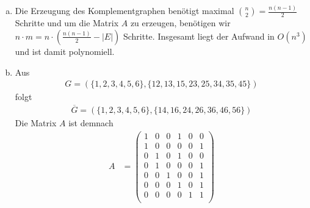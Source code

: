 \begin{enumerate}
\begin{enumerate}[(a)]
      \item Die Erzeugung des Komplementgraphen benötigt maximal $\binom{n}{2} =
        \frac{n(n-1)}{2}$ Schritte und um die Matrix $A$ zu erzeugen, benötigen
        wir $n \cdot m = n \cdot \left(\frac{n(n-1)}{2} - |E|\right)$ Schritte.
        Insgesamt liegt der Aufwand in $O(n^3)$ und ist damit polynomiell.

      \item Aus
        \begin{align*}
          G = (\{1,2,3,4,5,6\}, \{12, 13, 15, 23, 25, 34, 35, 45\})
        \end{align*}
        folgt
        \begin{align*}
          \overline{G} = (\{1,2,3,4,5,6\}, \{14, 16, 24, 26, 36, 46, 56\})
        \end{align*}
        Die Matrix $A$ ist demnach
        \begin{align*}
          A & = \begin{pmatrix}
            1 & 0 & 0 & 1 & 0 & 0\\
            1 & 0 & 0 & 0 & 0 & 1\\
            0 & 1 & 0 & 1 & 0 & 0\\
            0 & 1 & 0 & 0 & 0 & 1\\
            0 & 0 & 1 & 0 & 0 & 1\\
            0 & 0 & 0 & 1 & 0 & 1\\
            0 & 0 & 0 & 0 & 1 & 1\\
          \end{pmatrix}
        \end{align*}


\end{enumerate}
\end{enumerate}
